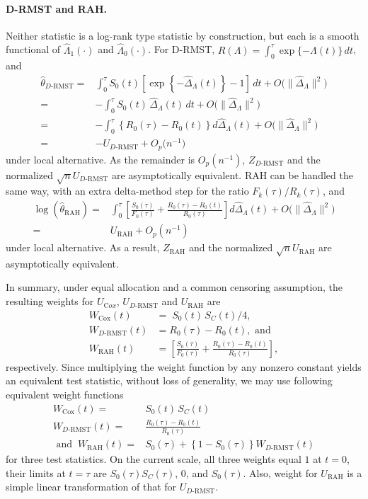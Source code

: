 \documentclass[12pt]{article}
\newcommand{\RAH}{\mathrm{RAH}}
\newcommand{\DRMST}{D\text{-}\mathrm{RMST}}
\newcommand{\dd}{\,d}
\begin{document}
\paragraph{D-RMST and RAH.}
Neither statistic is a log-rank type statistic by construction, but each is a
smooth functional of $\hat\Lambda_1(\cdot)$ and
$\hat\Lambda_0(\cdot)$.
For D-RMST, $R(\Lambda)=\int_0^\tau \exp\{-\Lambda(t)\}\dd t$, and
\begin{align*}
\hat{\theta}_{\DRMST}
=&\int_0^\tau S_0(t)\left[\exp\left\{-\hat{\Delta}_\Lambda(t)\right\}-1\right]\dd t+O\bigl(\|\hat{\Delta}_\Lambda\|^2\bigr)\\
=& -\int_0^\tau S_0(t)\,\hat{\Delta}_\Lambda(t)\dd t +O\bigl(\|\hat{\Delta}_\Lambda\|^2\bigr)\\
=&-\int_0^\tau \left\{R_0(\tau)-R_0(t)\right\}d\hat{\Delta}_\Lambda(t)+O\bigl(\|\hat{\Delta}_\Lambda\|^2\bigr) \\
=&-U_{\DRMST}+O_p\bigl(n^{-1}\bigr)
\label{eq:drmst-expansion}
\end{align*}
under local alternative. As the remainder is $O_p(n^{-1})$, $Z_{\DRMST}$ and the normalized $\sqrt{n}U_{\DRMST}$ are asymptotically equivalent.  RAH can be handled the same way, with an extra delta-method step for the ratio $F_k(\tau)/R_k(\tau)$, and
\begin{align*}
\log(\hat{\theta}_{\RAH})=& \int_0^\tau \left[\frac{S_0(\tau)}{F_0(\tau)}
              +\frac{ R_0(\tau)-R_0(t)}{R_0(\tau)}\right]d\hat{\Delta}_\Lambda(t)+O\bigl(\|\hat{\Delta}_\Lambda\|^2\bigr)\\
              =& U_{\RAH}+O_p(n^{-1})
\end{align*}
under local alternative. As a result, $Z_{\RAH}$ and the normalized $\sqrt{n}U_{\RAH}$ are asymptotically equivalent.

\medskip
In summary, under equal allocation and a common censoring assumption, the
resulting weights for $U_{\mathrm Cox}$, $U_{\DRMST}$ and $U_{\RAH}$ are
\begin{align*}
  W_{\mathrm{Cox}}(t)
    &=\;S_0(t)\,S_C(t)/4,\\
  W_{\DRMST}(t)
    &= R_0(\tau)-R_0(t), \mbox{ and}\\
  W_{\RAH}(t)
    &= \left[\frac{S_0(\tau)}{F_0(\tau)}
              +\frac{ R_0(\tau)-R_0(t)}{R_0(\tau)}\right],
\end{align*}
respectively. Since multiplying the weight function by any nonzero constant yields an equivalent test statistic, without loss of generality, we may use following equivalent weight functions
\begin{align*}
  W_{\mathrm{Cox}}(t)=&S_0(t)\,S_C(t)\\
  W_{\DRMST}(t)=&\frac{ R_0(\tau)-R_0(t)}{R_0(\tau)}\\
  \mbox{ and }~
  W_{\RAH}(t)=&S_0(\tau)+\left\{1-S_0(\tau)\right\}W_{\DRMST}(t)
\end{align*}
for three test statistics.
On the current scale, all three weights equal $1$ at $t=0$, their limits at
$t=\tau$ are $S_0(\tau)S_C(\tau)$, $0$, and $S_0(\tau)$. Also, weight for $U_{\RAH}$ is a simple linear transformation of that for $U_{\DRMST}$.
\end{document}
